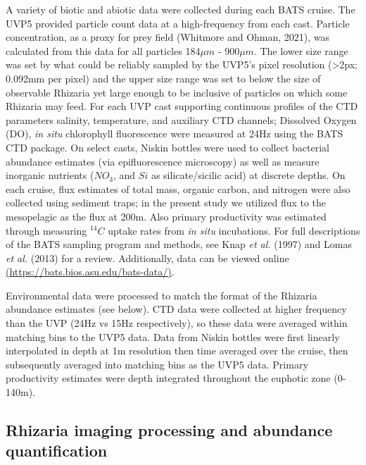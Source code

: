 \documentclass[
]{article}
\begin{document}
A variety of biotic and abiotic data were collected during each BATS
cruise. The UVP5 provided particle count data at a high-frequency from
each cast. Particle concentration, as a proxy for prey field (Whitmore
and Ohman, 2021), was calculated from this data for all particles
184\(\mu m\) - 900\(\mu m\). The lower size range was set by what could
be reliably sampled by the UVP5's pixel resolution (\textgreater2px;
0.092mm per pixel) and the upper size range was set to below the size of
observable Rhizaria yet large enough to be inclusive of particles on
which some Rhizaria may feed. For each UVP cast supporting continuous
profiles of the CTD parameters salinity, temperature, and auxiliary CTD
channels; Dissolved Oxygen (DO), \emph{in situ} chlorophyll fluorescence
were measured at 24Hz using the BATS CTD package. On select casts,
Niskin bottles were used to collect bacterial abundance estimates (via
epifluorescence microscopy) as well as measure inorganic nutrients
(\(NO_3\), and \(Si\) as silicate/sicilic acid) at discrete depths. On
each cruise, flux estimates of total mass, organic carbon, and nitrogen
were also collected using sediment traps; in the present study we
utilized flux to the mesopelagic as the flux at 200m. Also primary
productivity was estimated through measuring \(^{14}C\) uptake rates
from \emph{in situ} incubations. For full descriptions of the BATS
sampling program and methods, see Knap \emph{et al.} (1997) and Lomas
\emph{et al.} (2013) for a review. Additionally, data can be viewed
online
\href{https://bats.bios.asu.edu/bats-data/}{(https://bats.bios.asu.edu/bats-data/)}.

Environmental data were processed to match the format of the Rhizaria
abundance estimates (see below). CTD data were collected at higher
frequency than the UVP (24Hz vs 15Hz respectively), so these data were
averaged within matching bins to the UVP5 data. Data from Niskin bottles
were first linearly interpolated in depth at 1m resolution then time
averaged over the cruise, then subsequently averaged into matching bins
as the UVP5 data. Primary productivity estimates were depth integrated
throughout the euphotic zone (0-140m).

\subsection{Rhizaria imaging processing and abundance
quantification}\label{rhizaria-imaging-processing-and-abundance-quantification}
\end{document}
